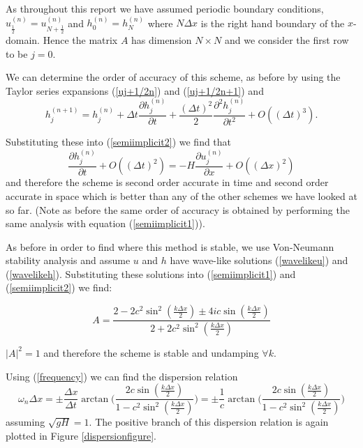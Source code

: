 \documentclass[a4paper,12pt, notitlepage]{article}
\begin{document}
As throughout this report we have assumed periodic boundary conditions, $u_{\frac{1}{2}}^{(n)} = u_{N + \frac{1}{2}}^{(n)}$ and $h_{0}^{(n)} = h_{N}^{(n)}$ where $N\Delta x$ is the right hand boundary of the $x$-domain. Hence the matrix $A$ has dimension $N \times N$ and we consider the first row to be $j = 0$.

We can determine the order of accuracy of this scheme, as before by using the Taylor series expansions (\ref{uj+1/2n}) and (\ref{uj+1/2n+1}) and
\begin{equation}
h_{j}^{(n+ 1)} = h_{j}^{(n)} + \Delta t \frac{\partial h_{j}^{(n)}}{\partial t} + \frac{(\Delta t)^{2}}{2}\frac{\partial^{2} h_{j}^{(n)}}{\partial t^{2}} + O((\Delta t)^{3}).
\end{equation}

Substituting these into (\ref{semiimplicit2}) we find that
\begin{equation}
\frac{\partial h_{j}^{(n)}}{\partial t} + O((\Delta t)^{2}) = - H \frac{\partial u_{j}^{(n)}}{\partial x} + O((\Delta x)^{2}) 
\end{equation}
and therefore the scheme is second order accurate in time and second order accurate in space which is better than any of the other schemes we have looked at so far. (Note as before the same order of accuracy is obtained by performing the same analysis with equation (\ref{semiimplicit1})).

As before in order to find where this method is stable, we use Von-Neumann stability analysis and assume $u$ and $h$ have wave-like solutions (\ref{wavelikeu}) and (\ref{wavelikeh}). Substituting these solutions into (\ref{semiimplicit1}) and (\ref{semiimplicit2}) we find:

\begin{equation}
A = \frac{2 - 2c^{2}\sin^{2}(\frac{k\Delta x}{2}) \pm 4ic\sin(\frac{k\Delta x}{2})}{2 + 2 c^{2}\sin^{2}(\frac{k\Delta x}{2})}
\end{equation}

$\lvert A \rvert^{2} = 1$ and therefore the scheme is stable and undamping $\forall k$.

Using (\ref{frequency}) we can find the dispersion relation
\begin{equation}
\omega_{n} \Delta x = \pm\frac{\Delta x}{\Delta t} \arctan\bigg(\frac{2 c \sin(\frac{k\Delta x}{2})}{1 - c^{2} \sin^{2}(\frac{k\Delta x}{2})}\bigg) = \pm\frac{1}{c} \arctan\bigg(\frac{2 c \sin(\frac{k\Delta x}{2})}{1 - c^{2} \sin^{2}(\frac{k\Delta x}{2})}\bigg)
\end{equation}
assuming $\sqrt{gH} = 1$. The positive branch of this dispersion relation is again plotted in Figure \ref{dispersionfigure}. 
\end{document}
